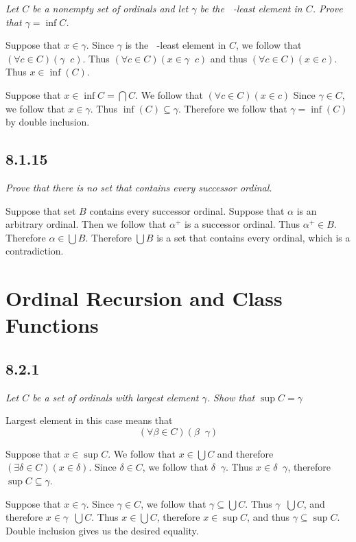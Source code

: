 \documentclass[11pt,oneside,titlepage]{book}
\DeclareMathOperator \ineq {\underline{\in}}
\begin{document}
\textit{Let $C$ be a nonempty set of ordinals and let $\gamma$ be the $\ineq$-least
  element in $C$. Prove that $\gamma = \inf C$.}

Suppose that $x \in \gamma$. Since $\gamma$ is the $\ineq$-least
element in $C$, we follow that $(\forall c \in C)(\gamma \ineq c)$. Thus
$(\forall c \in C)(x \in \gamma \ineq c)$ and thus $(\forall c \in C)(x \in c)$. Thus
$x \in \inf(C)$.

Suppose that $x \in \inf C = \bigcap{C}$. We follow that $(\forall c \in C)(x \in c)$
Since $\gamma \in C$, we follow that $x \in \gamma$. Thus $\inf(C) \subseteq \gamma$.
Therefore we follow that $\gamma = \inf(C)$ by double inclusion.

\subsection*{8.1.15}

\textit{Prove that there is no set that contains every successor ordinal.}

Suppose that set $B$ contains every successor ordinal. Suppose that $\alpha$ is an
arbitrary ordinal. Then we follow that $\alpha^+$ is a successor ordinal. Thus
$\alpha^+ \in B$. Therefore $\alpha \in \bigcup{B}$. Therefore $\bigcup{B}$
is a set that contains every ordinal, which is a contradiction.

\section{Ordinal Recursion and Class Functions}

\subsection*{8.2.1}

\textit{Let $C$ be a set of ordinals with largest element $\gamma$. Show that $\sup{C} = \gamma$}

Largest element in this case means that
$$(\forall \beta \in C)(\beta \ineq \gamma)$$

Suppose that $x \in \sup{C}$. We follow that $x \in \bigcup{C}$ and therefore
$(\exists \delta \in C)(x \in \delta)$. Since $\delta \in C$, we follow that
$\delta \ineq \gamma$. Thus $x \in \delta \ineq \gamma$, therefore
$\sup{C} \subseteq \gamma$.

Suppose that $x \in \gamma$. Since $\gamma \in C$, we follow that $\gamma \subseteq \bigcup{C}$.
Thus $\gamma \ineq \bigcup{C}$, and therefore $x \in \gamma \ineq \bigcup{C}$. Thus
$x \in \bigcup{C}$, therefore $x \in \sup{C}$, and thus $\gamma \subseteq \sup{C}$.
Double inclusion gives us the desired equality.
\end{document}
